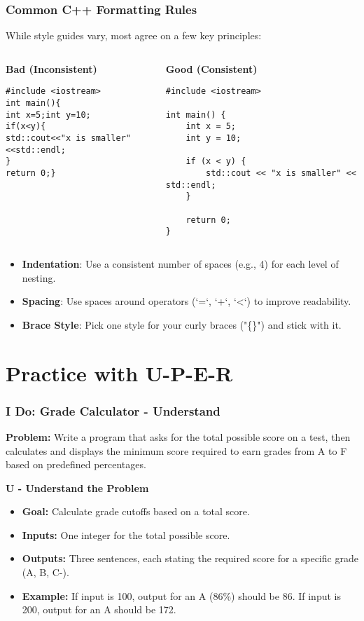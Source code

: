 \documentclass{beamer}
\begin{document}
\begin{frame}[fragile]
\frametitle{Common C++ Formatting Rules}
While style guides vary, most agree on a few key principles:

\begin{columns}[T]
\begin{column}{0.5\textwidth}
    \textbf{Bad (Inconsistent)}
    \begin{verbatim}
#include <iostream>
int main(){
int x=5;int y=10;
if(x<y){
std::cout<<"x is smaller"<<std::endl;
}
return 0;}
    \end{verbatim}
\end{column}
\begin{column}{0.5\textwidth}
    \textbf{Good (Consistent)}
    \begin{verbatim}
#include <iostream>

int main() {
    int x = 5;
    int y = 10;

    if (x < y) {
        std::cout << "x is smaller" << std::endl;
    }

    return 0;
}
    \end{verbatim}
\end{column}
\end{columns}

\begin{itemize}
    \item \textbf{Indentation}: Use a consistent number of spaces (e.g., 4) for each level of nesting.
    \item \textbf{Spacing}: Use spaces around operators (`=`, `+`, `<`) to improve readability.
    \item \textbf{Brace Style}: Pick one style for your curly braces ("\{\}") and stick with it.
\end{itemize}
\end{frame}

\section{Practice with U-P-E-R}

\begin{frame}
\frametitle{I Do: Grade Calculator - Understand}
\textbf{Problem:} Write a program that asks for the total possible score on a test, then calculates and displays the minimum score required to earn grades from A to F based on predefined percentages.

\vspace{1em}
\textbf{U - Understand the Problem}
\begin{itemize}
    \item \textbf{Goal:} Calculate grade cutoffs based on a total score.
    \item \textbf{Inputs:} One integer for the total possible score.
    \item \textbf{Outputs:} Three sentences, each stating the required score for a specific grade (A, B, C-).
    \item \textbf{Example:} If input is 100, output for an A (86\%) should be 86. If input is 200, output for an A should be 172.
\end{itemize}
\end{frame}
\end{document}
